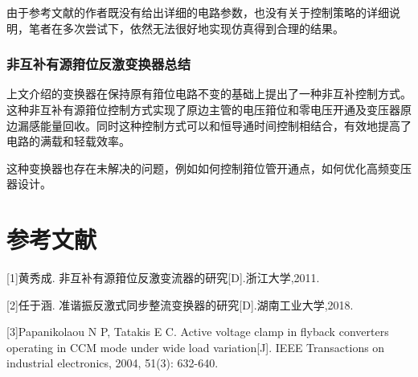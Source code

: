 \documentclass[UTF8]{ctexart}
\numberwithin{equation}{section}
\begin{document}
	由于参考文献的作者既没有给出详细的电路参数，也没有关于控制策略的详细说明，笔者在多次尝试下，依然无法很好地实现仿真得到合理的结果。
	
	\subsubsection{非互补有源箝位反激变换器总结}
	上文介绍的变换器在保持原有箝位电路不变的基础上提出了一种非互补控制方式。这种非互补有源箝位控制方式实现了原边主管的电压箝位和零电压开通及变压器原边漏感能量回收。同时这种控制方式可以和恒导通时间控制相结合，有效地提高了电路的满载和轻载效率。
	
	这种变换器也存在未解决的问题，例如如何控制箝位管开通点，如何优化高频变压器设计。
	
	\newpage
	\section*{参考文献}
	[1]黄秀成. 非互补有源箝位反激变流器的研究[D].浙江大学,2011.
	
	[2]任于涵. 准谐振反激式同步整流变换器的研究[D].湖南工业大学,2018.
	
	[3]Papanikolaou N P, Tatakis E C. Active voltage clamp in flyback converters operating in CCM mode under wide load variation[J]. IEEE Transactions on industrial electronics, 2004, 51(3): 632-640.
\end{document}
